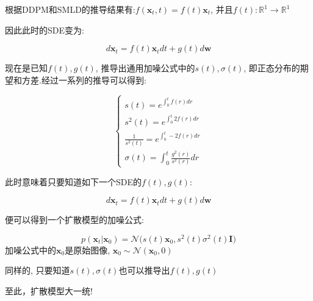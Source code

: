 根据DDPM和SMLD的推导结果有:$f(\mathbf{x}_{t}, t)=f(t)\mathbf{x}_{t}$, 并且$f(t): \mathbb{R}^{1}\to \mathbb{R}^{1}$

\newpage

因此此时的SDE变为:

$$
d\mathbf{x}_{t}=f(t)\mathbf{x}_{t}dt+g(t)d\mathbf{w}
$$

现在是已知$f(t), g(t)$, 推导出通用加噪公式中的$s(t), \sigma (t)$, 即正态分布的期望和方差.经过一系列的推导可以得到:

$$
\begin{cases}
    s(t)=e^{\int_{0}^{t}f(r)dr} \\
    s^{2}(t) = e^{\int_{0}^{t}2f(r)dr} \\
    \frac{1}{s^{2}(t)} = e^{\int_{0}^{t}-2f(r)dr} \\
    \sigma(t)=\int_{0}^{t}\frac{g^{2}(r)}{s^{2}(r)}dr
\end{cases}
$$

此时意味着只要知道如下一个SDE的$f(t), g(t)$:

$$d\mathbf{x}_{t}=f(t)\mathbf{x}_{t}dt+g(t)d\mathbf{w}$$

便可以得到一个扩散模型的加噪公式:

$$
p(\mathbf{x}_{t}|\mathbf{x}_{0})=
\mathcal{N}\bigg(s(t)\mathbf{x}_{0}, s^{2}(t)\sigma^{2}(t)\mathbf{I}\bigg)
$$
加噪公式中的$\mathbf{x}_{0}$是原始图像, $\mathbf{x}_{0} \sim \mathcal{N}(\mathbf{x}_{0}, 0)$

同样的, 只要知道$s(t),\sigma(t)$也可以推导出$f(t), g(t)$

至此，扩散模型大一统!
